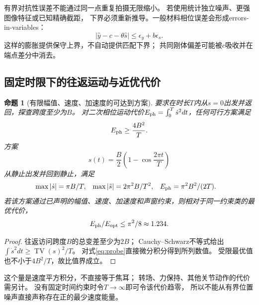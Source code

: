 \documentclass[11pt,a4paper]{article}
\numberwithin{equation}{section}
\newtheorem{proposition}[theorem]{命题}
\theoremstyle{definition}
\DeclareMathOperator{\TV}{TV}
\begin{document}
有界对抗性误差不能通过同一点重复拍摄无限缩小。
若使用统计独立噪声、更强图像特征或已知精确截距，
下界必须重新推导。一般材料相位误差会形成errors-in-variables：
\[
 |\widehat y-c-\theta\widehat s|
 \le\epsilon_y+b\epsilon_s .
\]
这样的膨胀提供保守上界，不自动提供匹配下界；
共同刚体偏差可能被$c$吸收并在端点差分中消去。

\subsection{固定时限下的往返运动与近优代价}
\begin{proposition}[有限幅值、速度、加速度的可达到方案]
要求在时长$T$内从$s=0$出发并返回，探查跨度至少为$B$。
对二次相位运动代价$E_{\rm ph}=\int_0^T\dot s^2dt$，任何可行方案满足
\[
 E_{\rm ph}\ge\frac{4B^2}{T}.
\]
方案
\begin{equation}
 s(t)=\frac B2\left(1-\cos\frac{2\pi t}{T}\right)
 \label{eq:probe}
\end{equation}
从静止出发并回到静止，满足
\begin{align}
 \max|\dot s|&=\pi B/T,&
 \max|\ddot s|&=2\pi^2B/T^2,&
 E_{\rm ph}&=\pi^2B^2/(2T).
 \label{eq:probebounds}
\end{align}
若该方案通过已声明的幅值、速度、加速度和声窗约束，则相对于同一约束类的最优代价，
\begin{equation}
 E_{\rm ph}/E_{\rm opt}\le\pi^2/8\approx1.234.
 \label{eq:approx}
\end{equation}
\end{proposition}
\begin{proof}
往返访问跨度$B$的总变差至少为$2B$；
Cauchy--Schwarz不等式给出$\int\dot s^2dt\ge\TV(s)^2/T$。
对式\eqref{eq:probe}直接微分积分得到所列数值。
受限最优值也不小于$4B^2/T$，故比值界成立。
\end{proof}
这个量是速度平方积分，不直接等于焦耳；
转场、力保持、其他关节动作的代价需另计。
没有固定时间约束时令$T\to\infty$即可令该代价趋零，
所以不能从有界位置噪声直接声称存在正的最少速度能量。
\end{document}
